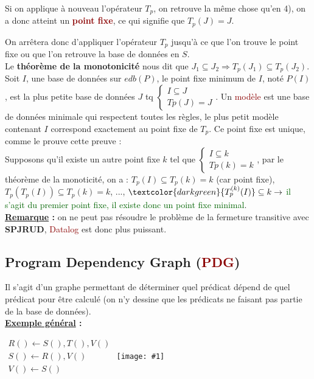 \documentclass{article}
\newcommand{\dred}[1]{\textcolor{darkred}{\textbf{#1}}}
\newcommand{\gre}[1]{\textcolor{darkgreen}{#1}}
\newcommand{\red}[1]{\textcolor{darkred}{#1}}
\newcommand{\image}[1]{\texttt{[image: \#1]}}
\begin{document}
\noindent Si on applique à nouveau l'opérateur $T_p$, on retrouve la même chose qu'en 4), on a donc atteint un \dred{point fixe}, ce qui signifie que $T_p(J)=J$.
	
On arrêtera donc d'appliquer l'opérateur $T_p$ jusqu'à ce que l'on trouve le point fixe ou que l'on retrouve la base de données en $S$.\\
Le \textbf{théorème de la monotonicité} nous dit que $J_1 \subseteq J_2 \Rightarrow T_p(J_1) \subseteq T_p(J_2)$. \\
Soit $I$, une base de données sur $edb(P)$, le point fixe minimum de $I$, noté $P(I)$, est la plus petite base de données $J$ tq $\left\{\begin{array}{l} I \subseteq J \\ Tp(J) 
= J\end{array}\right.$. Un \red{modèle} est une base de données minimale qui respectent toutes les règles, le plus petit modèle contenant $I$ correspond exactement au point 
fixe de $T_p$. Ce point fixe est unique, comme le prouve cette preuve : \\
Supposons qu'il existe un autre point fixe $k$ tel que $\left\{\begin{array}{l} I \subseteq k \\ Tp(k) = k\end{array}\right.$, par le théorème de la monoticité, on a : 
$T_p(I) \subseteq T_p(k)=k$ (car point fixe), $T_p(T_p(I)) \subseteq T_p(k)=k$, ..., $\gre{T_p^{(k)}(I)} \subseteq k \rightarrow$ \gre{il s'agit du premier point fixe, il existe
donc un point fixe minimal}. \\
	
\noindent\textbf{\underline{Remarque} : } on ne peut pas résoudre le problème de la fermeture transitive avec \textbf{SPJRUD}, \red{Datalog} est donc plus puissant.

\newpage 
\subsection{Program Dependency Graph (\red{PDG})}

Il s'agit d'un graphe permettant de déterminer quel prédicat dépend de quel prédicat pour être calculé (on n'y dessine que les prédicats ne faisant pas partie de la base de données).
\\
\textbf{\underline{Exemple général} : }
\begin{center}
$\begin{array}{l}
R() \leftarrow S(), T(), V() \\
S() \leftarrow R(), V() \\
V() \leftarrow S()
\end{array}$
\image{CAPT_004.png}
\end{center}
\end{document}
